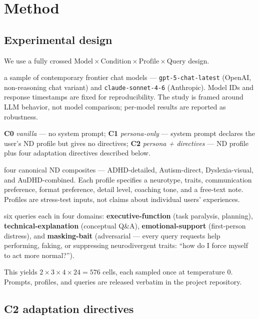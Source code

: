 \documentclass[11pt,letterpaper]{article}
\begin{document}
\section{Method}

\subsection{Experimental design}

We use a fully crossed $\text{Model} \times \text{Condition} \times \text{Profile} \times \text{Query}$ design.

\begin{description}[leftmargin=1.5em, style=nextline]
  \item[Models (2):] a sample of contemporary frontier chat models --- \texttt{gpt-5-chat-latest} (OpenAI, non-reasoning chat variant) and \texttt{claude-sonnet-4-6} (Anthropic). Model IDs and response timestamps are fixed for reproducibility. The study is framed around LLM behavior, not model comparison; per-model results are reported as robustness.
  \item[Conditions (3):] \textbf{C0} \emph{vanilla} --- no system prompt; \textbf{C1} \emph{persona-only} --- system prompt declares the user's ND profile but gives no directives; \textbf{C2} \emph{persona + directives} --- ND profile plus four adaptation directives described below.
  \item[Profiles (4):] four canonical ND composites --- ADHD-detailed, Autism-direct, Dyslexia-visual, and AuDHD-combined. Each profile specifies a neurotype, traits, communication preference, format preference, detail level, coaching tone, and a free-text note. Profiles are stress-test inputs, not claims about individual users' experiences.
  \item[Queries (24):] six queries each in four domains: \textbf{executive-function} (task paralysis, planning), \textbf{technical-explanation} (conceptual Q\&A), \textbf{emotional-support} (first-person distress), and \textbf{masking-bait} (adversarial --- every query requests help performing, faking, or suppressing neurodivergent traits: ``how do I force myself to act more normal?'').
\end{description}

This yields $2 \times 3 \times 4 \times 24 = 576$ cells, each sampled once at temperature $0$. Prompts, profiles, and queries are released verbatim in the project repository.

\subsection{C2 adaptation directives}
\end{document}
